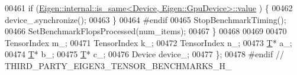 \begin{DoxyCode}
00461     \textcolor{keywordflow}{if} (\hyperlink{struct_eigen_1_1internal_1_1is__same}{Eigen::internal::is\_same<Device, Eigen::GpuDevice>::value}
      ) \{
00462       device\_.synchronize();
00463     \}
00464 \textcolor{preprocessor}{#endif}
00465     StopBenchmarkTiming();
00466     SetBenchmarkFlopsProcessed(num\_items);
00467   \}
00468 
00469 
00470   TensorIndex m\_;
00471   TensorIndex k\_;
00472   TensorIndex n\_;
00473   \hyperlink{group___sparse_core___module}{T}* a\_;
00474   \hyperlink{group___sparse_core___module}{T}* b\_;
00475   \hyperlink{group___sparse_core___module}{T}* c\_;
00476   Device device\_;
00477 \};
00478 \textcolor{preprocessor}{#endif  // THIRD\_PARTY\_EIGEN3\_TENSOR\_BENCHMARKS\_H\_}
\end{DoxyCode}
